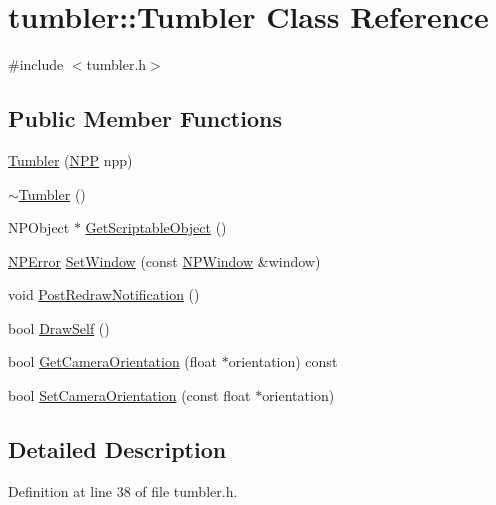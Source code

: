 \hypertarget{classtumbler_1_1_tumbler}{
\section{tumbler::Tumbler Class Reference}
\label{classtumbler_1_1_tumbler}
}


{\ttfamily \#include $<$tumbler.h$>$}

\subsection*{Public Member Functions}
\begin{DoxyCompactItemize}
\item 
\hyperlink{classtumbler_1_1_tumbler_a4f5dd0baa068ccb8214b0e477f7cd94b}{Tumbler} (\hyperlink{struct___n_p_p}{NPP} npp)
\item 
\hyperlink{classtumbler_1_1_tumbler_a80349e180aa825c15d63bada00c6e9a8}{$\sim$Tumbler} ()
\item 
NPObject $\ast$ \hyperlink{classtumbler_1_1_tumbler_ad438453c62d1edcbdd5cb39a38143a0b}{GetScriptableObject} ()
\item 
\hyperlink{npapi_8h_a56715bc92ac93f0447a05f852ce18828}{NPError} \hyperlink{classtumbler_1_1_tumbler_a6aba2f3cfa10be35c0a789924343b1b0}{SetWindow} (const \hyperlink{struct___n_p_window}{NPWindow} \&window)
\item 
void \hyperlink{classtumbler_1_1_tumbler_ab721f5f95ce020ce6680033771ed4577}{PostRedrawNotification} ()
\item 
bool \hyperlink{classtumbler_1_1_tumbler_a8da0b0b0e85708487c55f6ca5c999da1}{DrawSelf} ()
\item 
bool \hyperlink{classtumbler_1_1_tumbler_a5e01d6cde9baab4e5c2aa4b834733bf2}{GetCameraOrientation} (float $\ast$orientation) const 
\item 
bool \hyperlink{classtumbler_1_1_tumbler_a2657d32f15492fc56406d1750172ca8c}{SetCameraOrientation} (const float $\ast$orientation)
\end{DoxyCompactItemize}


\subsection{Detailed Description}


Definition at line 38 of file tumbler.h.



